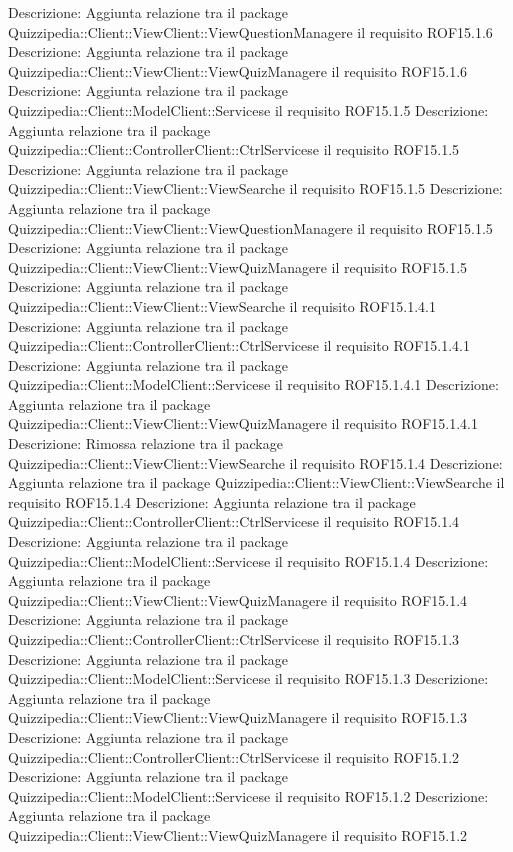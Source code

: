 Descrizione: Aggiunta relazione tra il package Quizzipedia::Client::ViewClient::ViewQuestionManagere il requisito ROF15.1.6 
Descrizione: Aggiunta relazione tra il package Quizzipedia::Client::ViewClient::ViewQuizManagere il requisito ROF15.1.6 
Descrizione: Aggiunta relazione tra il package Quizzipedia::Client::ModelClient::Servicese il requisito ROF15.1.5 
Descrizione: Aggiunta relazione tra il package Quizzipedia::Client::ControllerClient::CtrlServicese il requisito ROF15.1.5 
Descrizione: Aggiunta relazione tra il package Quizzipedia::Client::ViewClient::ViewSearche il requisito ROF15.1.5 
Descrizione: Aggiunta relazione tra il package Quizzipedia::Client::ViewClient::ViewQuestionManagere il requisito ROF15.1.5 
Descrizione: Aggiunta relazione tra il package Quizzipedia::Client::ViewClient::ViewQuizManagere il requisito ROF15.1.5 
Descrizione: Aggiunta relazione tra il package Quizzipedia::Client::ViewClient::ViewSearche il requisito ROF15.1.4.1 
Descrizione: Aggiunta relazione tra il package Quizzipedia::Client::ControllerClient::CtrlServicese il requisito ROF15.1.4.1 
Descrizione: Aggiunta relazione tra il package Quizzipedia::Client::ModelClient::Servicese il requisito ROF15.1.4.1 
Descrizione: Aggiunta relazione tra il package Quizzipedia::Client::ViewClient::ViewQuizManagere il requisito ROF15.1.4.1 
Descrizione: Rimossa relazione tra il package Quizzipedia::Client::ViewClient::ViewSearche il requisito ROF15.1.4 
Descrizione: Aggiunta relazione tra il package Quizzipedia::Client::ViewClient::ViewSearche il requisito ROF15.1.4 
Descrizione: Aggiunta relazione tra il package Quizzipedia::Client::ControllerClient::CtrlServicese il requisito ROF15.1.4 
Descrizione: Aggiunta relazione tra il package Quizzipedia::Client::ModelClient::Servicese il requisito ROF15.1.4 
Descrizione: Aggiunta relazione tra il package Quizzipedia::Client::ViewClient::ViewQuizManagere il requisito ROF15.1.4 
Descrizione: Aggiunta relazione tra il package Quizzipedia::Client::ControllerClient::CtrlServicese il requisito ROF15.1.3 
Descrizione: Aggiunta relazione tra il package Quizzipedia::Client::ModelClient::Servicese il requisito ROF15.1.3 
Descrizione: Aggiunta relazione tra il package Quizzipedia::Client::ViewClient::ViewQuizManagere il requisito ROF15.1.3 
Descrizione: Aggiunta relazione tra il package Quizzipedia::Client::ControllerClient::CtrlServicese il requisito ROF15.1.2 
Descrizione: Aggiunta relazione tra il package Quizzipedia::Client::ModelClient::Servicese il requisito ROF15.1.2 
Descrizione: Aggiunta relazione tra il package Quizzipedia::Client::ViewClient::ViewQuizManagere il requisito ROF15.1.2 
